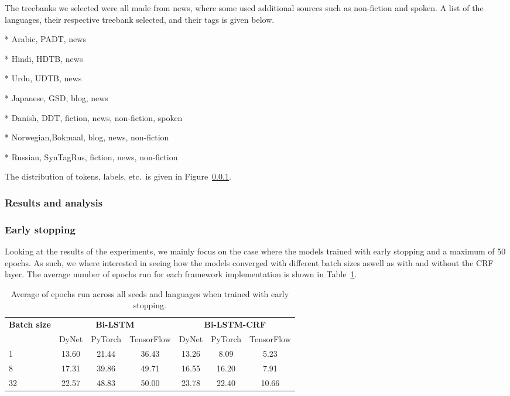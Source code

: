 The treebanks we selected were all made from news, where some used additional
sources such as non-fiction and spoken. A list of the languages, their
respective treebank selected, and their tags is given below.

* Arabic,   PADT, news

* Hindi,    HDTB, news

* Urdu,     UDTB, news

* Japanese, GSD, blog, news

* Danish,   DDT, fiction, news, non-fiction, spoken

* Norwegian,Bokmaal, blog, news, non-fiction

* Russian,  SynTagRus, fiction, news, non-fiction

The distribution of tokens, labels, etc.\ is given in Figure~\ref{}.

\subsubsection{Results and analysis}

\subsubsection*{Early stopping}

Looking at the results of the experiments, we mainly focus on the case where the
models trained with early stopping and a maximum of 50 epochs. As such, we where
interested in seeing how the models converged with different batch sizes aswell
as with and without the CRF layer. The average number of epochs run for each
framework implementation is shown in Table~\ref{table:epochs-run-pos}.

\begin{table}[h!]
    \centering
    \begin{tabular}{l c c c|c c c}
        \toprule
        \multirow{2}{*}{\bfseries Batch size}     &
        \multicolumn{3}{c}{\bfseries Bi-LSTM}     &
        \multicolumn{3}{c}{\bfseries Bi-LSTM-CRF} \\
        \cmidrule(lr){2-7}
        & DyNet & PyTorch & TensorFlow
        & DyNet & PyTorch & TensorFlow \\
        \cmidrule(lr){1-7}
         1 & 13.60 & 21.44 & 36.43 & 13.26 &  8.09 &  5.23 \\
         8 & 17.31 & 39.86 & 49.71 & 16.55 & 16.20 &  7.91 \\
        32 & 22.57 & 48.83 & 50.00 & 23.78 & 22.40 & 10.66 \\
        \bottomrule
    \end{tabular}
    \caption{Average of epochs run across all seeds and languages when trained
        with early stopping.
    }\label{table:epochs-run-pos}
\end{table}

